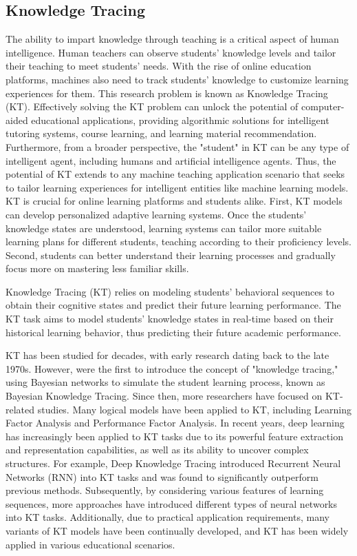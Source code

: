 \begin{survey}
\subsection{Knowledge Tracing}
The ability to impart knowledge through teaching is a critical aspect of human intelligence. Human teachers can observe students' knowledge levels and tailor their teaching to meet students' needs. With the rise of online education platforms, machines also need to track students' knowledge to customize learning experiences for them. This research problem is known as Knowledge Tracing (KT). Effectively solving the KT problem can unlock the potential of computer-aided educational applications, providing algorithmic solutions for intelligent tutoring systems, course learning, and learning material recommendation. Furthermore, from a broader perspective, the "student" in KT can be any type of intelligent agent, including humans and artificial intelligence agents. Thus, the potential of KT extends to any machine teaching application scenario that seeks to tailor learning experiences for intelligent entities like machine learning models\cite{abdelrahman2023knowledge}. KT is crucial for online learning platforms and students alike. First, KT models can develop personalized adaptive learning systems. Once the students' knowledge states are understood, learning systems can tailor more suitable learning plans for different students, teaching according to their proficiency levels. Second, students can better understand their learning processes and gradually focus more on mastering less familiar skills\cite{liu2019exploiting}.

Knowledge Tracing (KT) relies on modeling students' behavioral sequences to obtain their cognitive states and predict their future learning performance. The KT task aims to model students' knowledge states in real-time based on their historical learning behavior, thus predicting their future academic performance.

KT has been studied for decades, with early research dating back to the late 1970s. However, \citet{corbett1994knowledge} were the first to introduce the concept of "knowledge tracing," using Bayesian networks to simulate the student learning process, known as Bayesian Knowledge Tracing. Since then, more researchers have focused on KT-related studies. Many logical models have been applied to KT, including Learning Factor Analysis and Performance Factor Analysis. In recent years, deep learning has increasingly been applied to KT tasks due to its powerful feature extraction and representation capabilities, as well as its ability to uncover complex structures. For example, Deep Knowledge Tracing introduced Recurrent Neural Networks (RNN) into KT tasks and was found to significantly outperform previous methods. Subsequently, by considering various features of learning sequences, more approaches have introduced different types of neural networks into KT tasks. Additionally, due to practical application requirements, many variants of KT models have been continually developed, and KT has been widely applied in various educational scenarios\cite{liu2021survey}.


\end{survey}
